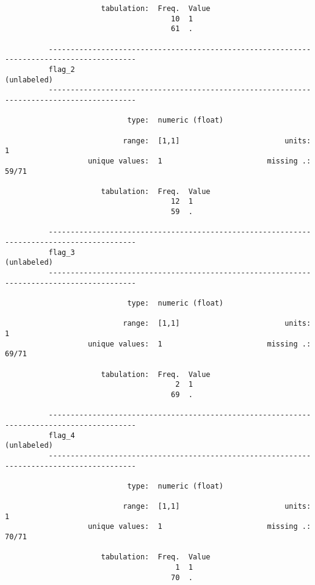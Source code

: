 \documentclass{article}
\begin{document}
\begin{verbatim}
                      tabulation:  Freq.  Value
                                      10  1
                                      61  .
          
          ------------------------------------------------------------------------------------------
          flag_2                                                                         (unlabeled)
          ------------------------------------------------------------------------------------------
          
                            type:  numeric (float)
          
                           range:  [1,1]                        units:  1
                   unique values:  1                        missing .:  59/71
          
                      tabulation:  Freq.  Value
                                      12  1
                                      59  .
          
          ------------------------------------------------------------------------------------------
          flag_3                                                                         (unlabeled)
          ------------------------------------------------------------------------------------------
          
                            type:  numeric (float)
          
                           range:  [1,1]                        units:  1
                   unique values:  1                        missing .:  69/71
          
                      tabulation:  Freq.  Value
                                       2  1
                                      69  .
          
          ------------------------------------------------------------------------------------------
          flag_4                                                                         (unlabeled)
          ------------------------------------------------------------------------------------------
          
                            type:  numeric (float)
          
                           range:  [1,1]                        units:  1
                   unique values:  1                        missing .:  70/71
          
                      tabulation:  Freq.  Value
                                       1  1
                                      70  .
          

\end{verbatim}
\end{document}
